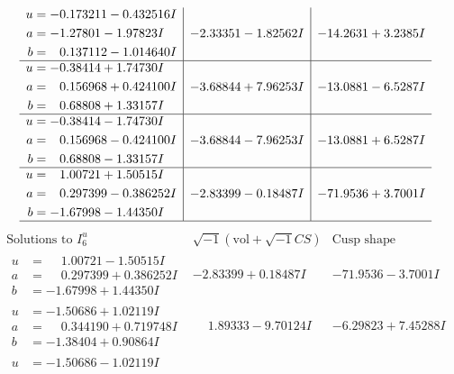 \documentclass[1p]{elsarticle_modified}
\theoremstyle{definition}
\newcommand{\I}{\sqrt{-1}}
\begin{document}
$$\begin{array}{c|c|c}
\begin{aligned}
u &= -0.173211 - 0.432516 I \\
a &= -1.27801 - 1.97823 I \\
b &= \phantom{-}0.137112 - 1.014640 I\end{aligned}
 & -2.33351 - 1.82562 I & -14.2631 + 3.2385 I \\ \hline\begin{aligned}
u &= -0.38414 + 1.74730 I \\
a &= \phantom{-}0.156968 + 0.424100 I \\
b &= \phantom{-}0.68808 + 1.33157 I\end{aligned}
 & -3.68844 + 7.96253 I & -13.0881 - 6.5287 I \\ \hline\begin{aligned}
u &= -0.38414 - 1.74730 I \\
a &= \phantom{-}0.156968 - 0.424100 I \\
b &= \phantom{-}0.68808 - 1.33157 I\end{aligned}
 & -3.68844 - 7.96253 I & -13.0881 + 6.5287 I \\ \hline\begin{aligned}
u &= \phantom{-}1.00721 + 1.50515 I \\
a &= \phantom{-}0.297399 - 0.386252 I \\
b &= -1.67998 - 1.44350 I\end{aligned}
 & -2.83399 - 0.18487 I & -71.9536 + 3.7001 I\\
 \hline 
 \end{array}$$\newpage$$\begin{array}{c|c|c}  
\text{Solutions to }I^u_{6}& \I (\text{vol} + \sqrt{-1}CS) & \text{Cusp shape}\\
 \hline 
\begin{aligned}
u &= \phantom{-}1.00721 - 1.50515 I \\
a &= \phantom{-}0.297399 + 0.386252 I \\
b &= -1.67998 + 1.44350 I\end{aligned}
 & -2.83399 + 0.18487 I & -71.9536 - 3.7001 I \\ \hline\begin{aligned}
u &= -1.50686 + 1.02119 I \\
a &= \phantom{-}0.344190 + 0.719748 I \\
b &= -1.38404 + 0.90864 I\end{aligned}
 & \phantom{-}1.89333 - 9.70124 I & -6.29823 + 7.45288 I \\ \hline\begin{aligned}
u &= -1.50686 - 1.02119 I \\

\end{aligned}
\end{array}$$
\end{document}
